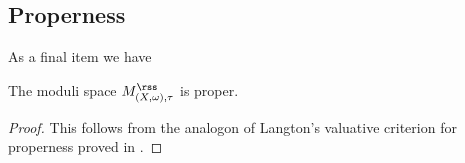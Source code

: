 \subsection{Properness}

As a final item we have

\begin{Prop}[Properness]\label{prop:properness} The moduli space $M_{(X,\omega),\tau}^{{\rss}}$
is proper.
\end{Prop}
\begin{proof}
This follows from the analogon of Langton's valuative criterion for properness proved in \cite{TomaCriteria}.
\end{proof}

